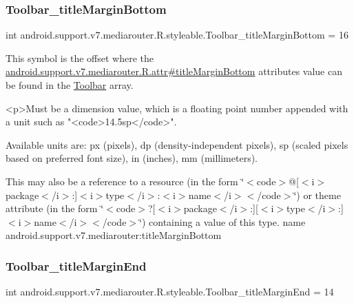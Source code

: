 \subsubsection{\texorpdfstring{Toolbar\+\_\+title\+Margin\+Bottom}{Toolbar\_titleMarginBottom}}
{\footnotesize\ttfamily int android.\+support.\+v7.\+mediarouter.\+R.\+styleable.\+Toolbar\+\_\+title\+Margin\+Bottom = 16\hspace{0.3cm}{\ttfamily [static]}}

This symbol is the offset where the \hyperlink{classandroid_1_1support_1_1v7_1_1mediarouter_1_1R_1_1attr_aac9daa5285fa9308e4afab0e650b8f85}{android.\+support.\+v7.\+mediarouter.\+R.\+attr\#title\+Margin\+Bottom} attribute\textquotesingle{}s value can be found in the \hyperlink{classandroid_1_1support_1_1v7_1_1mediarouter_1_1R_1_1styleable_a6815cdfaadde30c82b955863af196899}{Toolbar} array.

\begin{DoxyVerb}      <p>Must be a dimension value, which is a floating point number appended with a unit such as "<code>14.5sp</code>".
\end{DoxyVerb}
 Available units are\+: px (pixels), dp (density-\/independent pixels), sp (scaled pixels based on preferred font size), in (inches), mm (millimeters). 

This may also be a reference to a resource (in the form \char`\"{}$<$code$>$@\mbox{[}$<$i$>$package$<$/i$>$\+:\mbox{]}$<$i$>$type$<$/i$>$\+:$<$i$>$name$<$/i$>$$<$/code$>$\char`\"{}) or theme attribute (in the form \char`\"{}$<$code$>$?\mbox{[}$<$i$>$package$<$/i$>$\+:\mbox{]}\mbox{[}$<$i$>$type$<$/i$>$\+:\mbox{]}$<$i$>$name$<$/i$>$$<$/code$>$\char`\"{}) containing a value of this type.  name android.\+support.\+v7.\+mediarouter\+:title\+Margin\+Bottom \mbox{\label{classandroid_1_1support_1_1v7_1_1mediarouter_1_1R_1_1styleable_a5591b917ffe94c9777044faf432a7a7d}} 
\subsubsection{\texorpdfstring{Toolbar\+\_\+title\+Margin\+End}{Toolbar\_titleMarginEnd}}
{\footnotesize\ttfamily int android.\+support.\+v7.\+mediarouter.\+R.\+styleable.\+Toolbar\+\_\+title\+Margin\+End = 14\hspace{0.3cm}{\ttfamily [static]}}

